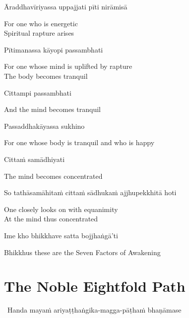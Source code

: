 Āraddhavīriyassa uppajjati pīti nirāmisā

\begin{english}
  For one who is energetic\\
  Spiritual rapture arises
\end{english}

Pītimanassa kāyopi passambhati

\begin{english}
  For one whose mind is uplifted by rapture\\
  The body becomes tranquil
\end{english}

Cittampi passambhati

\begin{english}
  And the mind becomes tranquil
\end{english}

Passaddhakāyassa sukhino

\begin{english}
  For one whose body is tranquil and who is happy
\end{english}

Cittaṁ samādhiyati

\begin{english}
  The mind becomes concentrated
\end{english}

So tathāsamāhitaṁ cittaṁ sādhukaṁ ajjhupekkhitā hoti

\begin{english}
  One closely looks on with equanimity\\
  At the mind thus concentrated
\end{english}

\suttaRef{[SN 46.3]}

Ime kho bhikkhave satta bojjhaṅgā'ti

\begin{english}
  Bhikkhus these are the Seven Factors of Awakening
\end{english}

\suttaRef{[SN 46.22]}


\section{The Noble Eightfold Path}
\label{noble-eightfold-path}

\begin{leader}
  \anglebracketleft\ \hspace{-0.5mm}Handa mayaṁ ariyaṭṭhaṅgika-magga-pāṭhaṁ bhaṇāmase \hspace{-0.5mm}\anglebracketright\
\end{leader}

